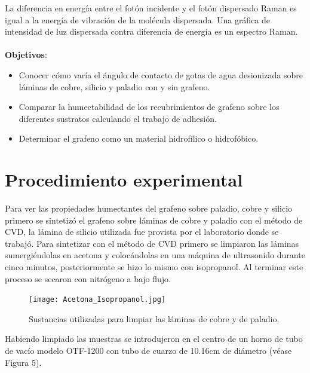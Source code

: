 \documentclass[twocolumn,letterpaper,aps,pra,10pt]{revtex4-1}
\begin{document}
La diferencia en energía entre el fotón incidente y el fotón dispersado Raman es igual a la energía de vibración de la molécula dispersada. Una gráfica de intensidad de luz dispersada contra diferencia de energía es un espectro Raman\cite{Raman2}.
\\
\\
{\large \textbf{Objetivos}}:
\begin{itemize}
    \item Conocer cómo varía el ángulo de contacto de gotas de agua desionizada sobre láminas de cobre, silicio y paladio con y sin grafeno.
    \item Comparar la humectabilidad de los recubrimientos de grafeno sobre los diferentes sustratos calculando el trabajo de adhesión.
    \item Determinar el grafeno como un material hidrofílico o hidrofóbico.
   
\end{itemize}
\section{Procedimiento experimental}
Para ver las propiedades humectantes del grafeno sobre paladio, cobre y silicio primero se sintetizó el grafeno sobre láminas de cobre y paladio con el método de CVD, la lámina de silicio utilizada fue provista por el laboratorio donde se trabajó. Para sintetizar con el método de CVD primero se limpiaron las láminas sumergiéndolas en acetona y colocándolas en una máquina de ultrasonido durante cinco minutos, posteriormente se hizo lo mismo con isopropanol. Al terminar este proceso se secaron con nitrógeno a bajo flujo.

\begin{figure}[h]
\centering
\texttt{[image: Acetona\_Isopropanol.jpg]}
\caption{Sustancias utilizadas para limpiar las láminas de cobre y de paladio.}
\end{figure}

Habiendo limpiado las muestras se introdujeron en el centro de un horno de tubo de vacío modelo OTF-1200 con tubo de cuarzo de 10.16cm de diámetro (véase Figura 5). 
\end{document}

